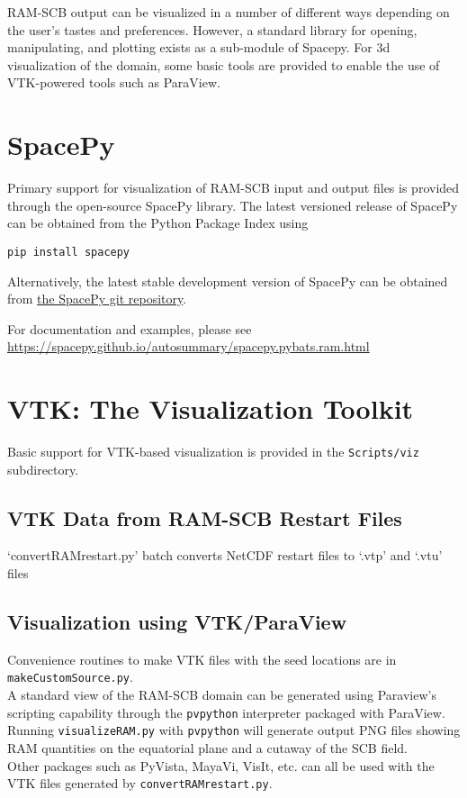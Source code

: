 RAM-SCB output can be visualized in a number of different ways depending on the user's tastes and preferences.  However, a standard library for opening, manipulating, and plotting exists as a sub-module of Spacepy. For 3d visualization of the domain, some basic tools are provided to enable the use of VTK-powered tools such as ParaView.

\section{SpacePy}
Primary support for visualization of RAM-SCB input and output files is provided through the open-source SpacePy library. The latest versioned release of SpacePy can be obtained from the Python Package Index using
\begin{verbatim}
pip install spacepy
\end{verbatim}

Alternatively, the latest stable development version of SpacePy can be obtained from \href{https://github.com/spacepy/spacepy}{the SpacePy git repository}.

For documentation and examples, please see \href{https://spacepy.github.io/autosummary/spacepy.pybats.ram.html}{https://spacepy.github.io/autosummary/spacepy.pybats.ram.html}

\section{VTK: The Visualization Toolkit}
Basic support for VTK-based visualization is provided in the {\tt Scripts/viz} subdirectory.

\subsection{VTK Data from RAM-SCB Restart Files}
`convertRAMrestart.py' batch converts NetCDF restart files to `.vtp' and `.vtu' files

\subsection{Visualization using VTK/ParaView}
Convenience routines to make VTK files with the seed locations are in {\tt makeCustomSource.py}.\\
A standard view of the RAM-SCB domain can be generated using Paraview's scripting capability through the {\tt pvpython} interpreter packaged with ParaView. Running {\tt visualizeRAM.py} with {\tt pvpython} will generate output PNG files showing RAM quantities on the equatorial plane and a cutaway of the SCB field.\\
Other packages such as PyVista, MayaVi, VisIt, etc. can all be used with the VTK files generated by {\tt convertRAMrestart.py}.

